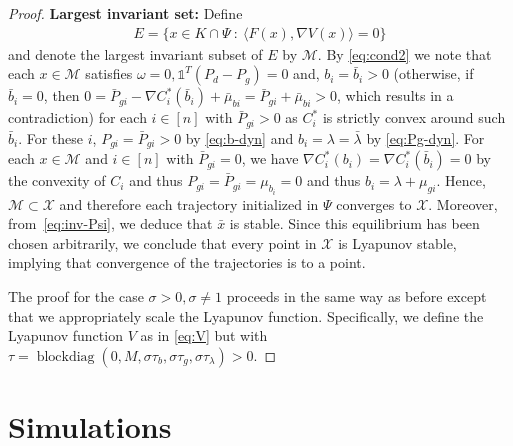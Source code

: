 \documentclass[journal]{IEEEtran}
\newcommand{\w}{\omega}
\newcommand{\1}{\mathds 1}
\newcommand{\n}{\nabla}
\renewcommand{\l}{\lambda}
\DeclareMathOperator{\blockdiag}{blockdiag}
\theoremstyle{remark}
\theoremstyle{definition}
\begin{document}
\begin{proof}
  \textbf{Largest invariant set:} Define
  \begin{align*}
    E=\{x\in K\cap \Psi \ : \ \langle F(x),\nabla V(x) \rangle=0\}
  \end{align*}
  and denote the largest invariant subset of $E$ by $\mathcal M$. By
  \eqref{eq:cond2} we note that each $x\in \mathcal M$ satisfies
  $\w=0, \1^T(P_d-P_g)=0$ and, $b_i=\bar b_i>0$ (otherwise, if $\bar
  b_i=0$, then $0=\bar P_{gi}-\n C_i^*(\bar b_i)+\bar\mu_{bi}=\bar
  P_{gi}+\bar\mu_{bi}>0$, which results in a contradiction) for each
  $i\in[n]$ with $\bar P_{gi}>0$ as $C_i^*$ is strictly convex around
  such $\bar b_i$. For these $i$, $P_{gi}=\bar P_{gi}>0$ by
  \eqref{eq:b-dyn} and $b_i=\l=\bar \l$ by \eqref{eq:Pg-dyn}.  For
  each $x\in\mathcal M$ and $i\in[n]$ with $\bar P_{gi}=0$, we have
  $\n C_i^*(b_i)=\n C_i^*(\bar b_i)=0$ by the convexity of $C_i$ and
  thus $P_{gi}=\bar P_{gi}=\mu_{b_i}=0$ and thus $b_i=\l+\mu_{gi}$.
  Hence, $\mathcal M\subset \mathcal X$ and therefore each trajectory
  initialized in $\Psi$ converges to $\mathcal X$. Moreover,
  from~\eqref{eq:inv-Psi}, we deduce that $\bar{x}$ is stable. Since
  this equilibrium has been chosen arbitrarily, we conclude that every
  point in $\mathcal X$ is Lyapunov stable, implying that convergence
  of the trajectories is to a point.

  The proof for the case $\sigma>0,\sigma\neq 1$ proceeds in the same
  way as before except that we appropriately scale the Lyapunov
  function. Specifically, we define the Lyapunov function $V$ as in
  \eqref{eq:V} but with
  $\tau=\blockdiag(0,M,\sigma\tau_b,\sigma\tau_g,\sigma\tau_\l)>0$.
\end{proof}

\section{Simulations}\label{sec:simulations}
\end{document}

